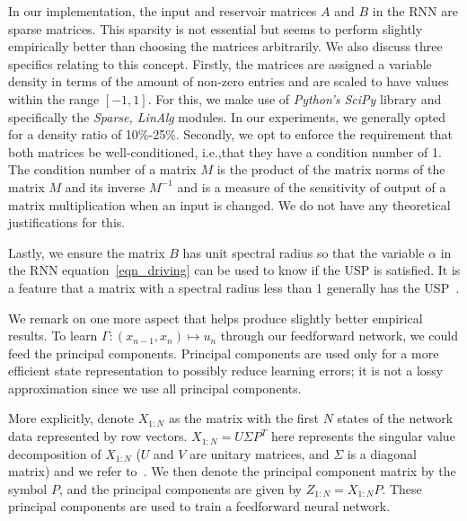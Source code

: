 In our implementation, the input and reservoir  matrices $A$ and $B$ in the RNN are sparse matrices. This sparsity is not essential but seems to perform slightly empirically better than choosing the matrices arbitrarily.  We also discuss three specifics relating to this concept. Firstly, the matrices are assigned a variable density in terms of the amount of non-zero entries and are scaled to have values within the range $[-1,1]$. For this, we make use of \textit{Python's SciPy} library and specifically the \textit{Sparse, LinAlg} modules. In our experiments, we generally opted for a density ratio of 10\%-25\%.
Secondly, we opt to enforce the requirement that both matrices be well-conditioned, i.e.,that they have a condition number of 1. The condition number of a matrix $M$ is the product of the matrix norms of the matrix $M$ and its inverse $M^{-1}$ and is a measure of the sensitivity of output of a matrix multiplication when an input is changed.  We do not have any theoretical justifications for this. 

Lastly, we ensure the matrix $B$ has unit spectral radius so that the variable $\alpha$ in the RNN equation~\eqref{eqn_driving} can be used to know if the USP is satisfied. 
It is a  feature that a matrix with a spectral radius less than 1 generally has the USP~\cite{yildiz2012re}.  

We remark on one more aspect that helps produce slightly better empirical results.  To learn $\Gamma: (x_{n-1},x_{n}) \mapsto u_n$ through our feedforward network, we could feed the principal components. 
Principal components are used only for a more efficient state representation to possibly reduce learning errors; it is not a lossy approximation since we use all principal components.

More explicitly, denote $X_{1:N}$ as the matrix with the first $N$ states of the network data represented by row vectors. 
$X_{1:N}=U\Sigma P^T$ here represents the singular value decomposition of $X_{1:N}$ ($U$ and $V$ are unitary matrices, and $\Sigma$ is a diagonal matrix) and we refer to~\cite{walters2000introduction}. 
We then denote the principal component matrix by the symbol $P$, and the principal components are given by 
 $Z_{1:N}=X_{1:N}P$.
These principal components are used to train a feedforward neural network. 

